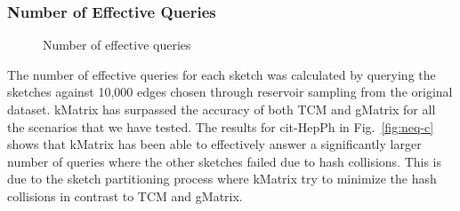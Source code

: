 \subsubsection{Number of Effective Queries}

\begin{figure}[htbp] 
    \centering
    \hfill
    \hfill
    \caption{Number of effective queries}
    \label{fig:edgq-queries-neq-test}
\end{figure}

The number of effective queries for each sketch was calculated by querying the sketches against 10,000 edges chosen through reservoir sampling from the original dataset. kMatrix has surpassed the accuracy of both TCM and gMatrix for all the scenarios that we have tested. The results for cit-HepPh in Fig.~\ref{fig:neq-c} shows that kMatrix has been able to effectively answer a significantly larger number of queries where the other sketches failed due to hash collisions. This is due to the sketch partitioning process where kMatrix try to minimize the hash collisions in contrast to TCM and gMatrix.  